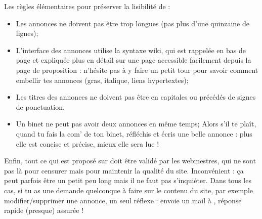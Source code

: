 Les r\`egles \'el\'ementaires pour pr\'eserver la lisibilit\'e de \fkz :
\begin{itemize}
 \item Les annonces ne doivent pas \^etre trop longues (pas plus d'une quinzaine de lignes);
 \item L'interface des annonces utilise la syntaxe wiki, qui est rappel\'ee en bas de page et expliqu\'ee plus en d\'etail
        sur une page accessible facilement depuis la page de proposition :
        n'h\'esite pas \`a  y faire un petit tour pour savoir comment embellir tes annonces
        (gras, italique, liens hypertextes);
 \item Les titres des annonces ne doivent pas \^etre en capitales ou pr\'ec\'ed\'es de signes de ponctuation.
 \item Un binet ne peut pas avoir deux annonces en m\^eme temps;
       Alors s'il te pla\^it, quand tu fais la com' de ton binet, r\'efl\'echis et \'ecris une belle annonce :
       plus elle est concise et pr\'ecise, mieux elle sera lue !
\end{itemize}

Enfin, tout ce qui est propos\'e sur \fkz doit \^etre valid\'e par les
webmestres, qui ne sont pas l\`a  pour censurer mais pour maintenir la
qualit\'e du site. Inconv\'enient : \c ca peut parfois \^etre un petit peu
long mais il ne faut pas s'inqui\'eter. Dans tous les cas, si tu as une
demande quelconque \`a  faire sur le contenu du site, par exemple
modifier/supprimer une annonce, un seul r\'eflexe : envoie un mail \`a 
, r\'eponse rapide (presque) assur\'ee !


